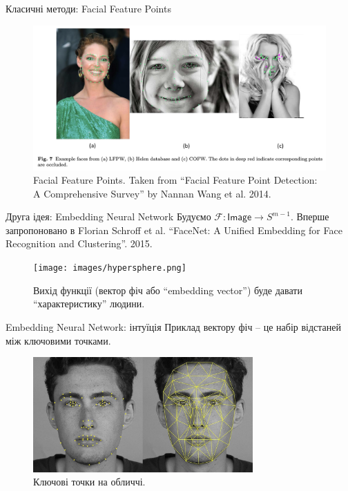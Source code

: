 \documentclass{zkdl-presentation-template}
\begin{document}
    \begin{frame}{Класичні методи: Facial Feature Points}
        \begin{figure}
        \centering
            \includegraphics[width=\textwidth]{images/feature_points.png}
            \caption{Facial Feature Points. Taken from ``Facial Feature Point Detection: A Comprehensive Survey'' by Nannan Wang et al. 2014.}
        \end{figure}
    \end{frame}

    \begin{frame}{Друга ідея: Embedding Neural Network}
        Будуємо $\mathcal{F}: \mathsf{Image} \to S^{m-1}$. Вперше запропоновано в Florian Schroff et al. ``FaceNet: A Unified Embedding for Face Recognition and Clustering''. 2015. 
        \begin{figure}
        \centering
            \texttt{[image: images/hypersphere.png]}
            \caption{Вихід функції (вектор фіч або ``embedding vector'') буде давати ``характеристику'' людини.}
        \end{figure}
    \end{frame}

    \begin{frame}{Embedding Neural Network: інтуїція}
        Приклад вектору фіч -- це набір відстаней між ключовими точками.
        \begin{figure}
        \centering
            \includegraphics[width=0.75\textwidth]{images/keypoints.jpg}
            \caption{Ключові точки на обличчі.}
        \end{figure}
    \end{frame}
\end{document}
